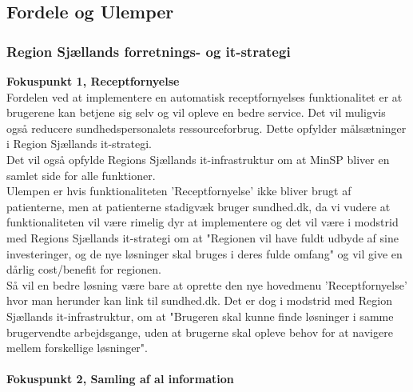 %
%
%
\subsection{Fordele og Ulemper}
\subsubsection{Region Sjællands forretnings- og it-strategi}
\textbf{Fokuspunkt 1, Receptfornyelse}\\
Fordelen ved at implementere en automatisk receptfornyelses funktionalitet er at brugerene kan betjene sig selv og vil opleve en bedre service. Det vil muligvis også reducere sundhedspersonalets ressourceforbrug. Dette opfylder målsætninger i Region Sjællands it-strategi.\\
Det vil også opfylde Regions Sjællands it-infrastruktur om at MinSP bliver en samlet side for alle funktioner.\\
Ulempen er hvis funktionaliteten 'Receptfornyelse' ikke bliver brugt af patienterne, men at patienterne stadigvæk bruger sundhed.dk, da vi vudere at funktionaliteten vil være rimelig dyr at implementere og det vil være i modstrid med Regions Sjællands it-strategi om at "Regionen vil have fuldt udbyde af sine investeringer, og de nye løsninger skal bruges i deres fulde omfang" og vil give en dårlig cost/benefit for regionen.\\ 
Så vil en bedre løsning være bare at oprette den nye hovedmenu  'Receptfornyelse' hvor man herunder kan link til sundhed.dk. Det er dog i modstrid med Region Sjællands it-infrastruktur, om at "Brugeren skal kunne finde løsninger i samme brugervendte arbejdsgange, uden at brugerne skal opleve behov for at navigere mellem forskellige løsninger". 
\\\\
\textbf{Fokuspunkt 2, Samling af al information}
